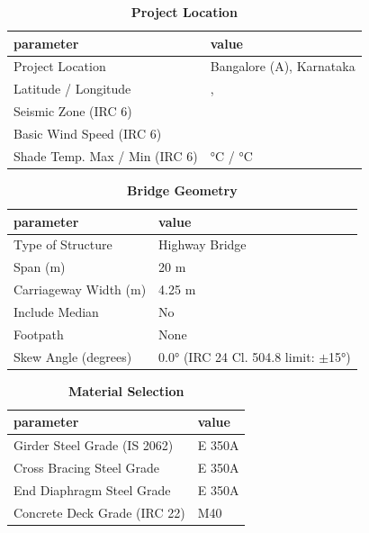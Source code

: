 \documentclass[12pt,a4paper]{report}
\numberwithin{table}{chapter}
\numberwithin{figure}{chapter}
\begin{document}
\begin{table}[H]
\caption{\textbf{Project Location}}
\label{subsec:project-location}
\begin{tabular}{|L{5.5cm}|L{8.5cm}|}
\hline
\textbf{parameter} & \textbf{value} \\
\hline
\textnormal{Project Location} & Bangalore (A), Karnataka \\
\hline
\textnormal{Latitude / Longitude} & ,  \\
\hline
\textnormal{Seismic Zone (IRC 6)} &  \\
\hline
\textnormal{Basic Wind Speed (IRC 6)} &  \\
\hline
\textnormal{Shade Temp. Max / Min (IRC 6)} &  °C /  °C \\
\hline
\end{tabular}
\vspace{0.4cm}
\end{table}

\begin{table}[H]
\caption{\textbf{Bridge Geometry}}
\label{subsec:bridge-geometry}
\begin{tabular}{|L{5.5cm}|L{8.5cm}|}
\hline
\textbf{parameter} & \textbf{value} \\
\hline
\textnormal{Type of Structure} & Highway Bridge \\
\hline
\textnormal{Span (m)} & 20 m \\
\hline
\textnormal{Carriageway Width (m)} & 4.25 m \\
\hline
\textnormal{Include Median} & No \\
\hline
\textnormal{Footpath} & None \\
\hline
\textnormal{Skew Angle (degrees)} & 0.0° (IRC 24 Cl. 504.8 limit: $\pm$15°) \\
\hline
\end{tabular}
\end{table}
\vspace{0.4cm}

\begin{table}[H]
\caption{\textbf{Material Selection}}
\label{subsec:material}
\begin{tabular}{|L{5.5cm}|L{8.5cm}|}
\hline
\textbf{parameter} & \textbf{value} \\
\hline
\textnormal{Girder Steel Grade (IS 2062)} & E 350A \\
\hline
\textnormal{Cross Bracing Steel Grade} & E 350A \\
\hline
\textnormal{End Diaphragm Steel Grade} & E 350A \\
\hline
\textnormal{Concrete Deck Grade (IRC 22)} & M40 \\
\hline
\end{tabular}
\end{table}
\vspace{0.4cm}
\end{document}
